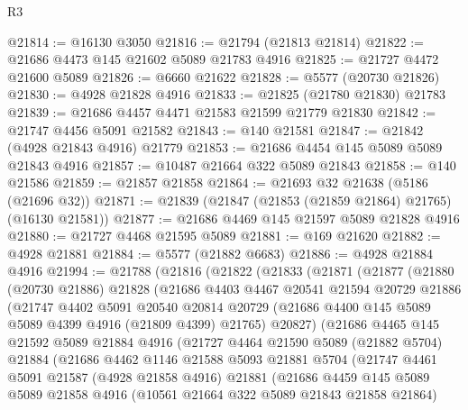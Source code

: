 \begin{lexlean}{R3}
\begin{coremodule}
@21814 := @16130 @3050
@21816 := @21794 (@21813 @21814)
@21822 := @21686 @4473 @145 @21602 @5089 @21783 @4916
@21825 := @21727 @4472 @21600 @5089
@21826 := @6660 @21622
@21828 := @5577 (@20730 @21826)
@21830 := @4928 @21828 @4916
@21833 := @21825 (@21780 @21830) @21783
@21839 := @21686 @4457 @4471 @21583 @21599 @21779 @21830
@21842 := @21747 @4456 @5091 @21582
@21843 := @140 @21581
@21847 := @21842 (@4928 @21843 @4916) @21779
@21853 := @21686 @4454 @145 @5089 @5089 @21843 @4916
@21857 := @10487 @21664 @322 @5089 @21843
@21858 := @140 @21586
@21859 := @21857 @21858
@21864 := @21693 @32 @21638 (@5186 (@21696 @32))
@21871 := @21839 (@21847 (@21853 (@21859 @21864) @21765) (@16130 @21581))
@21877 := @21686 @4469 @145 @21597 @5089 @21828 @4916
@21880 := @21727 @4468 @21595 @5089
@21881 := @169 @21620
@21882 := @4928 @21881
@21884 := @5577 (@21882 @6683)
@21886 := @4928 @21884 @4916
@21994 := @21788
    (@21816
      (@21822
        (@21833
          (@21871
            (@21877
              (@21880
                (@20730 @21886)
                @21828
                (@21686
                  @4403
                  @4467
                  @20541
                  @21594
                  @20729
                  @21886
                  (@21747
                    @4402
                    @5091
                    @20540
                    @20814
                    @20729
                    (@21686 @4400 @145 @5089 @5089 @4399 @4916 (@21809 @4399) @21765)
                    @20827)
                  (@21686
                    @4465
                    @145
                    @21592
                    @5089
                    @21884
                    @4916
                    (@21727
                      @4464
                      @21590
                      @5089
                      (@21882 @5704)
                      @21884
                      (@21686
                        @4462
                        @1146
                        @21588
                        @5093
                        @21881
                        @5704
                        (@21747
                          @4461
                          @5091
                          @21587
                          (@4928 @21858 @4916)
                          @21881
                          (@21686
                            @4459
                            @145
                            @5089
                            @5089
                            @21858
                            @4916
                            (@10561 @21664 @322 @5089 @21843 @21858 @21864)

\end{coremodule}
\end{lexlean}
